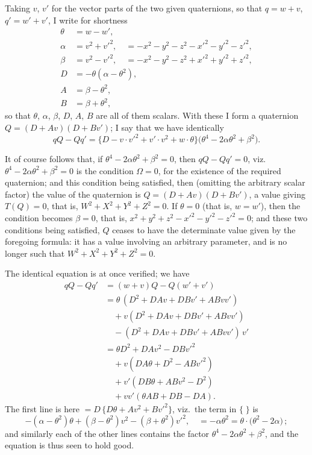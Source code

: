 \documentclass[11pt]{article}
\begin{document}
\medskip

Taking $v$, $v'$ for the vector parts of the two given quaternions, so that $q = w + v$, $q' = w' + v'$, I write for shortness
\begin{align*}
\theta &= w - w', \\
\alpha &= v^{2} + v'^{2}, \quad = -x^{2} - y^{2} - z^{2} - x'^{2} - y'^{2} - z'^{2}, \\
\beta  &= v^{2} - v'^{2}, \quad = -x^{2} - y^{2} - z^{2} + x'^{2} + y'^{2} + z'^{2}, \\
D &= -\theta(\alpha - \theta^{2}), \\
A &= \beta - \theta^{2}, \\
B &= \beta + \theta^{2},
\end{align*}
so that $\theta$, $\alpha$, $\beta$, $D$, $A$, $B$ are all of them scalars. With these I form a quaternion $Q = (D + Av)(D + Bv')$; I say that we have identically
\[
qQ - Qq' = \{D - v\cdot v'^{2} + v'\cdot v^{2} + w\cdot\theta\}\bigl(\theta^{4} - 2\alpha\theta^{2} + \beta^{2}\bigr).
\]

\medskip

It of course follows that, if $\theta^{4} - 2\alpha\theta^{2} + \beta^{2} = 0$, then $qQ - Qq' = 0$, viz.\ $\theta^{4} - 2\alpha\theta^{2} + \beta^{2} = 0$ is the condition $\Omega = 0$, for the existence of the required quaternion; and this condition being satisfied, then (omitting the arbitrary scalar factor) the value of the quaternion is $Q = (D + Av)(D + Bv')$, a value giving $T(Q) = 0$, that is, $W^{2} + X^{2} + Y^{2} + Z^{2} = 0$. If $\theta = 0$ (that is, $w = w'$), then the condition becomes $\beta = 0$, that is, $x^{2} + y^{2} + z^{2} - x'^{2} - y'^{2} - z'^{2} = 0$; and these two conditions being satisfied, $Q$ ceases to have the determinate value given by the foregoing formula: it has a value involving an arbitrary parameter, and is no longer such that $W^{2} + X^{2} + Y^{2} + Z^{2} = 0$.

\medskip

The identical equation is at once verified; we have
\begin{align*}
qQ - Qq' &= (w + v)Q - Q(w' + v') \\
         &= \theta\,(D^{2} + DAv + DBv' + ABvv') \\
         &\quad{}+ v(D^{2} + DAv + DBv' + ABvv') \\
         &\quad{}- (D^{2} + DAv + DBv' + ABvv')\,v' \\
         &= \theta D^{2} + DAv^{2} - DBv'^{2} \\
         &\quad{}+ v(DA\theta + D^{2} - ABv'^{2}) \\
         &\quad{}+ v'(DB\theta + ABv^{2} - D^{2}) \\
         &\quad{}+ vv'(\theta AB + DB - DA).
\end{align*}
The first line is here $= D\,\{D\theta + Av^{2} + Bv'^{2}\}$, viz.\ the term in $\{\;\}$ is
\[
-(\alpha - \theta^{2})\theta + (\beta - \theta^{2})v^{2} - (\beta + \theta^{2})v'^{2},\quad = -\alpha\theta^{2} = \theta\cdot\bigl(\theta^{2} - 2\alpha\bigr)\,;
\]
and similarly each of the other lines contains the factor $\theta^{4} - 2\alpha\theta^{2} + \beta^{2}$, and the equation is thus seen to hold good.
\end{document}
